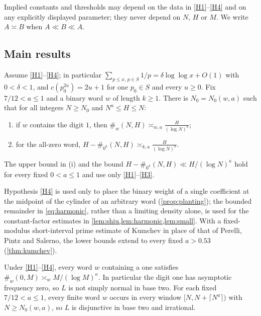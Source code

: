 \documentclass[11pt]{article}
\newcommand{\cnt}{\#}
\begin{document}
Implied constants and thresholds may depend on the data in
\ref{H1}--\ref{H4} and on any explicitly displayed parameter; they never depend
on $N$, $H$ or $M$. We write $A\asymp B$ when $A\ll B\ll A$.

\subsection{Main results}

\begin{maintheorem}\label{thm:words}
Assume \ref{H1}--\ref{H4}; in particular
$\sum_{p\le x,\,p\in S}1/p=\delta\log\log x+O(1)$ with $0<\delta<1$, and
$c(p_0^{2u})=2u+1$ for one $p_0\in S$ and every $u\ge0$. Fix $7/12<a\le1$ and a
binary word $w$ of length $k\ge1$. There is $N_0=N_0(w,a)$ such that for all integers $N\ge N_0$ and
$N^a\le H\le N$:
\begin{enumerate}[label=\textup{(\roman*)}]
\item if $w$ contains the digit $1$, then
  $\displaystyle \cnt_w(N,H)\asymp_{w,a}\frac{H}{(\log N)^{\kappa}}$;
\item for the all-zero word,
  $\displaystyle H-\cnt_{0^k}(N,H)\asymp_{k,a}\frac{H}{(\log N)^{\kappa}}$.
\end{enumerate}
The upper bound in \textup{(i)} and the bound $H-\cnt_{0^k}(N,H)\ll H/(\log N)^\kappa$
hold for every fixed $0<a\le1$ and use only \ref{H1}--\ref{H3}.
\end{maintheorem}

Hypothesis \ref{H4} is used only to place the binary weight of a single
coefficient at the midpoint of the cylinder of an arbitrary word
(\cref{prop:planting}); the bounded remainder in \eqref{eq:harmonic}, rather
than a limiting density alone, is used for the constant-factor estimates in
\cref{lem:shiu,lem:harmonic,lem:small}. With a fixed-modulus short-interval
prime estimate of Kumchev in place of that of Perelli, Pintz and Salerno, the
lower bounds extend to every fixed $a>0.53$ (\cref{thm:kumchev}).

\begin{corollary}\label{cor:disjunctive}
Under \ref{H1}--\ref{H4}, every word $w$ containing a one satisfies
$\cnt_w(0,M)\asymp_w M/(\log M)^{\kappa}$. In particular the digit one has
asymptotic frequency zero, so $L$ is not simply normal in base two. For each
fixed $7/12<a\le1$, every finite word $w$ occurs in every window
$[N,N+\lceil N^a\rceil)$ with $N\ge N_0(w,a)$, so $L$ is disjunctive in base two
and irrational.
\end{corollary}
\end{document}
